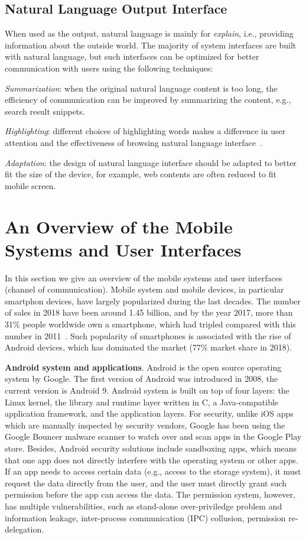 \subsection{Natural Language Output Interface}

When used as the output, natural language is mainly for \textit{explain}, i.e., providing information about the outside world. The majority of system interfaces are built with natural language, but such interfaces can be optimized for better communication with users using the following techniques:

\textit{Summarization}: when the original natural language content is too long, the efficiency of communication can be improved by summarizing the content, e.g., search result snippets. 

\textit{Highlighting}: different choices of highlighting words makes a difference in user attention and the effectiveness of browsing natural language interface~\cite{patel2005systems}.

\textit{Adaptation}: the design of natural language interface should be adapted to better fit the size of the device, for example, web contents are often reduced to fit mobile screen. 

\section{An Overview of the Mobile Systems and User Interfaces}

In this section we give an overview of the mobile systems and user interfaces (channel of communication). Mobile system and mobile devices, in particular smartphon devices, have largely popularized during the last decades. The number of sales in 2018 have been around 1.45 billion, and by the year 2017, more than 31\% people worldwide own a smartphone, which had tripled compared with this number in 2011~\cite{smartphonechart}. Such popularity of smartphones is associated with the rise of Android devices, which has dominated the market (77\% market share in 2018). 

\textbf{Android system and applications}. Android is the open source operating system by Google. The first version of Android was introduced in 2008, the current version is Android 9. Android system is built on top of four layers: the Linux kernel, the library and runtime layer written in C, a Java-compatible application framework, and the application layers. For security, unlike iOS apps which are manually inspected by security vendors, Google has been using the Google Bouncer malware scanner to watch over and scan apps in the Google Play store. Besides, Android security solutions include sandboxing apps, which means that one app does not directly interfere with the operating system or other apps. If an app needs to access certain data (e.g., access to the storage system), it must request the data directly from the user, and the user must directly grant such permission before the app can access the data. The permission system, however, has multiple vulnerabilities, such as stand-alone over-priviledge problem and information leakage, inter-process communication (IPC) collusion, permission re-delegation. 

